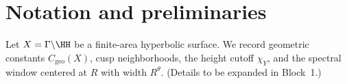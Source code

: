 \section{Notation and preliminaries}\label{sec:prelim}
Let $X=\Gamma\backslash\HH$ be a finite-area hyperbolic surface.
We record geometric constants $C_{\mathrm{geo}}(X)$, cusp neighborhoods, 
the height cutoff $\chi_Y$, and the spectral window centered at $R$ with width $R^\theta$.
(Details to be expanded in Block~1.)
